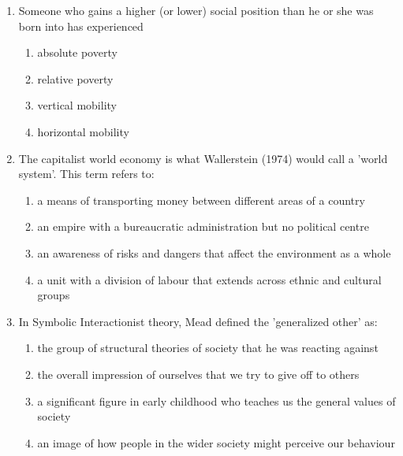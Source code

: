 \documentclass[12pt]{article}
\begin{document}
\begin{enumerate}[label=\arabic*.]
\begin{enumerate}[label=(\alph*)]
    \item the media exaggerate reports of deviant groups, generating hostile reactions
    \item children watch violent or sexually explicit films and then copy the behaviour
    \item audiences challenge the ethnic stereotypes represented by the media
    \item elitists express concern with the Americanization of culture
\end{enumerate}
\item Someone who gains a higher (or lower) social position than he or she was born into has experienced
\begin{enumerate}[label=(\alph*)]
    \item absolute poverty
    \item relative poverty
    \item vertical mobility
    \item horizontal mobility
\end{enumerate}
\item The capitalist world economy is what Wallerstein (1974) would call a 'world system'. This term refers to:
\begin{enumerate}[label=(\alph*)]
    \item a means of transporting money between different areas of a country
    \item an empire with a bureaucratic administration but no political centre
    \item an awareness of risks and dangers that affect the environment as a whole
    \item a unit with a division of labour that extends across ethnic and cultural groups
\end{enumerate}
\item In Symbolic Interactionist theory, Mead defined the 'generalized other' as:
\begin{enumerate}[label=(\alph*)]
    \item the group of structural theories of society that he was reacting against
    \item the overall impression of ourselves that we try to give off to others
    \item a significant figure in early childhood who teaches us the general values of society
    \item an image of how people in the wider society might perceive our behaviour
\end{enumerate}

\end{enumerate}
\end{document}
